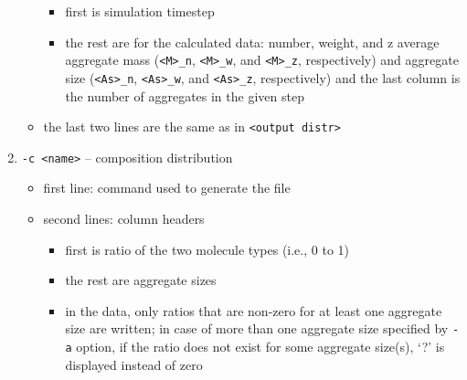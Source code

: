 \begin{enumerate}[nosep,leftmargin=20pt]
\begin{itemize}[nosep,leftmargin=5pt]
\begin{itemize}[nosep,leftmargin=10pt]
        \item first is simulation timestep
        \item the rest are for the calculated data: number, weight, and z
          average aggregate mass (\texttt{<M>\_n}, \texttt{<M>\_w}, and
          \texttt{<M>\_z}, respectively) and aggregate size
          (\texttt{<As>\_n}, \texttt{<As>\_w}, and \texttt{<As>\_z},
          respectively) and the last column is the number of aggregates in
          the given step
      \end{itemize}
    \item the last two lines are the same as in \texttt{<output distr>}
  \end{itemize}
\item \texttt{-c <name>} -- composition distribution
  \begin{itemize}[nosep,leftmargin=5pt]
    \item first line: command used to generate the file
    \item second lines: column headers
      \begin{itemize}[nosep,leftmargin=10pt]
        \item first is ratio of the two molecule types (i.e., 0 to 1)
        \item the rest are aggregate sizes
        \item in the data, only ratios that are non-zero for at least one
          aggregate size are written; in case of more than one aggregate
          size specified by \texttt{-a} option, if the ratio does not exist
          for some aggregate size(s), `?' is displayed instead of zero
      \end{itemize}
  \end{itemize}
\end{enumerate}
